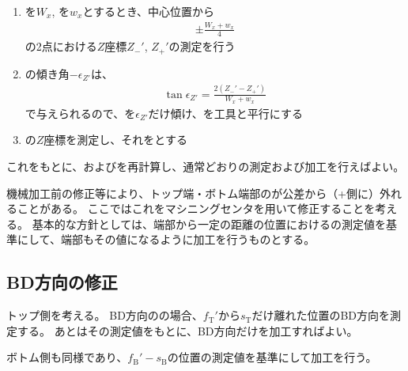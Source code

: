 \begin{enumerate}[label=\sarrow]
\item \ACOD を$W_x$, \TopEndACID を$w_x$とするとき、中心位置から
\begin{align*}
  \pm\frac{W_x+w_x}4
\end{align*}
の2点における$Z$座標$Z_-'$, $Z_+'$の測定を行う
\item \TopEndFace の傾き角$-\epsilon_{Z'}$は、
\begin{align*}
  \tan\epsilon_{Z'} = \frac{2(Z_-'-Z_+')}{W_x+w_x}
\end{align*}
で与えられるので、\Table を$\epsilon_{Z'}$だけ傾け、\TopEndFace を工具と平行にする
\item \TopEndFace の$Z$座標を測定し、それを\TopAlocationLength とする
\end{enumerate}
これをもとに、\AlocationAngle および\DimpleAngle を再計算し、通常どおり\Dimple の測定および加工を行えばよい。



\clearpage
機械加工前の修正等により、トップ端・ボトム端部の\OuterDiameter が公差から（+側に）外れることがある。
ここではこれをマシニングセンタを用いて修正することを考える。
基本的な方針としては、端部から一定の距離の位置における\OuterDiameter の測定値を基準にして、端部もその値になるように加工を行うものとする。


\subsection{BD方向\OuterDiameter の修正}
トップ側を考える。
BD方向の\OuterDiameter の場合、\TopReAlocationLength$f_\mathrm T'$から$s_\mathrm T$だけ離れた位置のBD方向\OuterDiameter を測定する。
あとはその測定値をもとに、BD方向だけを加工すればよい。

ボトム側も同様であり、$f_\mathrm B'-s_\mathrm B$の位置の測定値を基準にして加工を行う。



